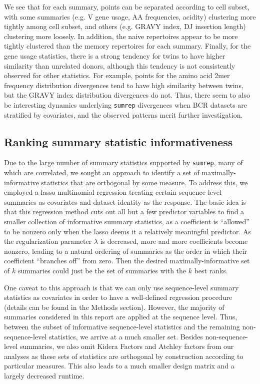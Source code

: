 \documentclass{article}
\begin{document}
We see that for each summary, points can be separated according to cell subset, with some summaries (e.g. V gene usage, AA frequencies, acidity) clustering more tightly among cell subset, and others (e.g. GRAVY index, DJ insertion length) clustering more loosely.
In addition, the naive repertoires appear to be more tightly clustered than the memory repertoires for each summary.
Finally, for the gene usage statistics, there is a strong tendency for twins to have higher similarity than unrelated donors, although this tendency is not consistently observed for other statistics.
For example, points for the amino acid 2mer frequency distribution divergences tend to have high similarity between twins, but the GRAVY index distribution divergences do not.
Thus, there seem to also be interesting dynamics underlying \texttt{sumrep} divergences when BCR datasets are stratified by covariates, and the observed patterns merit further investigation.

\subsection*{Ranking summary statistic informativeness}
Due to the large number of summary statistics supported by \texttt{sumrep}, many of which are correlated, we sought an approach to identify a set of maximally-informative statistics that are orthogonal by some measure.
To address this, we employed a lasso multinomial regression treating certain sequence-level summaries as covariates and dataset identity as the response.
The basic idea is that this regression method cuts out all but a few predictor variables to find a smaller collection of informative summary statistics, as a coefficient is ``allowed'' to be nonzero only when the lasso deems it a relatively meaningful predictor.
As the regularization parameter $\lambda$ is decreased, more and more coefficients  become nonzero, leading to a natural ordering of summaries as the order in which their coefficient ``branches off'' from zero.
Then the desired maximally-informative set of $k$ summaries could just be the set of summaries with the $k$ best ranks.

One caveat to this approach is that we can only use sequence-level summary statistics as covariates in order to have a well-defined regression procedure (details can be found in the Methods section).
However, the majority of summaries considered in this report are applied at the sequence level.
Thus, between the subset of informative sequence-level statistics and the remaining non-sequence-level statistics, we arrive at a much smaller set.
Besides non-sequence-level summaries, we also omit Kidera Factors and Atchley factors from our analyses as these sets of statistics are orthogonal by construction according to particular measures.
This also leads to a much smaller design matrix and a largely decreased runtime.
\end{document}
